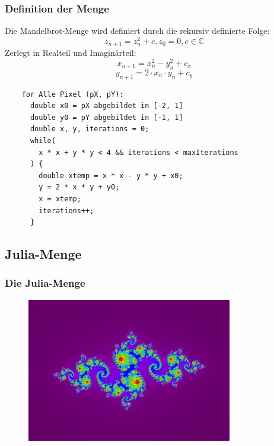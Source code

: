 \documentclass[unknownkeysallowed]{beamer}
\begin{document}
\begin{frame}
  \frametitle{Definition der Menge}
  Die Mandelbrot-Menge wird definiert durch die rekursiv definierte Folge:
  \begin{equation*}
    z_{n+1} = z^2_n + c, z_0 = 0, c \in \mathbb{C}
  \end{equation*}
  Zerlegt in Realteil und Imaginärteil:
  \begin{equation*}
    x_{n+1} = x^2_n - y^2_n + c_x
  \end{equation*}
  \begin{equation*}
    y_{n+1} = 2 \cdot x_n \cdot y_n + c_y
  \end{equation*}
\end{frame}

\begin{frame}[fragile]
  \begin{verbatim}
    for Alle Pixel (pX, pY):
      double x0 = pX abgebildet in [-2, 1]
      double y0 = pY abgebildet in [-1, 1]
      double x, y, iterations = 0;
      while(
        x * x + y * y < 4 && iterations < maxIterations
      ) {
        double xtemp = x * x - y * y + x0;
        y = 2 * x * y + y0;
        x = xtemp;
        iterations++;
      }
  \end{verbatim}
\end{frame}

\subsection{Julia-Menge}
\begin{frame}
  \frametitle{Die Julia-Menge}
  \begin{figure}[ht]
    \centering
    \includegraphics[width=0.8\textwidth]{images/fractal-julia.png}
  \end{figure}
\end{frame}
\end{document}

